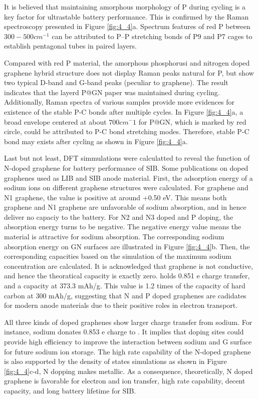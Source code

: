It is believed that maintaining amorphous morphology of P during cycling is a key factor for ultrastable battery performance. 
This is confirmed by the Raman spectroscopy presented in Figure \ref{fig:4_4}a. 
Spectrum features of red P between $300-500 cm^{-1}$ can be attributed to P–P stretching bonds of P9 and P7 cages to establish pentagonal tubes in paired layers.

Compared with red P material, the amorphous phosphorusi and nitrogen doped graphene hybrid structure does not display Raman peaks natural for P, but show two typical D-band and G-band peaks (peculiar to graphene).\cite{Kim2013c} 
The result indicates that the layerd P@GN paper was maintained during cycling. 
Additionally, Raman spectra of various samples provide more evidences for existence of the stable P-C bonds after multiple cycles. 
In Figure \ref{fig:4_4}a, a broad envelope centered at about $700 cm^-1$ for P@GN, which is marked by red circle, could be attributed to P-C bond stretching modes. 
Therefore, stable P-C bond may exists after cycling as shown in Figure \ref{fig:4_4}a. 

Last but not least, DFT simmulations were calculatted to reveal the function of N-doped graphene for battery performance of SIB. 
Some publications on doped graphenes used as LIB and SIB anode material.\cite{Yang2011c,Wen2014b,Wang2013h,Wang2012e,Wang2014f} 
First, the adsorption energy of a sodium ions on different graphene structures were calculated. 
For graphene and N1 graphene, the value is positive at around +0.50 eV. 
This means both graphene and N1 graphene are unfavorable of sodium absorption, and in hence deliver no capaciy to the battery. 
For N2 and N3 doped and P doping, the absorption energy turns to be negative. 
The negative energy value means the material is attractive for sodium absorption. 
The corresponding sodium absorption energy on GN surfaces are illustrated in Figure \ref{fig:4_4}b. 
Then, the corresponding capacities based on the simulation of the maximum sodium concentration are calculated. 
It is acknowledged that graphene is not conductive, and hence the theoratical capacity is exactly zero.
 holds 0.851 e charge transfer, and a capacity at 373.3 mAh/g. This value is 1.2 times of the capacity of hard carbon at 300 mAh/g, suggesting that N and P doped graphenes are cadidates for modern anode materials due to their positive roles in electron transport. 

All three kinds of doped graphenes show larger charge transfer from sodium.
For instance, sodium donates 0.853 e charge to . 
It implies that doping sites could provide high efficiency to improve the interaction between sodium and G surface for future sodium ion storage. 
The high rate capability of the N-doped graphene is also supported by the density of states simulations as shown in Figure \ref{fig:4_4}c-d, N dopping makes  metallic. 
As a consequence, theoretically, N doped graphene is favorable for electron and ion transfer, high rate capability, decent capacity, and long battery lifetime for SIB.


